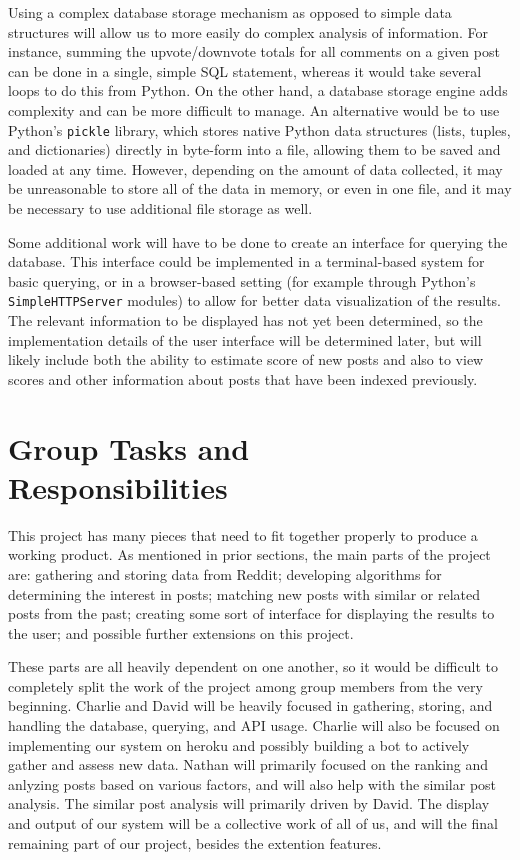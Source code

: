 \documentclass{acm_proc_article-sp}
\begin{document}
Using a complex database storage mechanism as opposed to simple data structures will allow us to more
easily do complex analysis of information.  For instance, summing the upvote/downvote totals for all
comments on a given post can be done in a single, simple SQL statement, whereas it would take several
loops to do this from Python.  On the other hand, a database storage engine adds complexity and can
be more difficult to manage.  An alternative would be to use Python's \texttt{pickle} library, which
stores native Python data structures (lists, tuples, and dictionaries) directly in byte-form into a file,
allowing them to be saved and loaded at any time.  However, depending on the amount of data collected,
it may be unreasonable to store all of the data in memory, or even in one file, and it may be necessary
to use additional file storage as well.


Some additional work will have to be done to create an interface for querying the database.  This
interface could be implemented in a terminal-based system for basic querying, or in a
browser-based setting (for example through Python's \texttt{SimpleHTTPServer} modules) to allow
for better data visualization of the results.  The relevant information to be displayed has not
yet been determined, so the implementation details of the user interface will be determined later,
but will likely include both the ability to estimate score of new posts and also to view scores
and other information about posts that have been indexed previously.


\section{Group Tasks and \\Responsibilities}

This project has many pieces that need to fit together properly to produce a working product.
As mentioned in prior sections, the main parts of the project are: gathering and storing data
from Reddit; developing algorithms for determining the interest in posts; matching new posts
with similar or related posts from the past; creating some sort of interface for
displaying the results to the user; and possible further extensions on this project.

These parts are all heavily dependent on one another, so it would be difficult to completely
split the work of the project among group members from the very beginning. Charlie and David
will be heavily focused in gathering, storing, and handling the database, querying, and API
usage. Charlie will also be focused on implementing our system on heroku and possibly
building a bot to actively gather and assess new data. Nathan will primarily focused 
on the ranking and anlyzing posts based on various factors, and will also help with the similar post
analysis. The similar post analysis will primarily driven by David. The display and output
of our system will be a collective work of all of us, and will the final remaining part of 
our project, besides the extention features.
\end{document}

